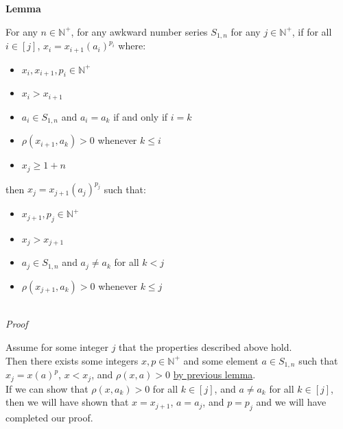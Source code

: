 \documentclass[a4paper,12pt]{article}
\begin{document}
\label{lemma:awkward_expansion}
\hypertarget{lemma:awkward_expansion}{}
\begin{tcolorbox}
\textbf{Lemma}

For any $n \in \mathbb{N}^+$, for any awkward number series $S_{1,n}$ for any $j \in \mathbb{N}^+$, if for all $i \in [j]$, $x_i = x_{i + 1}(a_i)^{p_i}$ where:

\begin{itemize}
\item $x_i, x_{i + 1}, p_i \in \mathbb{N}^+$

\item $x_i > x_{i + 1}$

\item $a_i \in S_{1, n}$ and $a_i = a_k$ if and only if $i = k$

\item $\rho(x_{i + 1}, a_k) > 0$ whenever $k \leq i$

\item $x_j \geq 1 + n$
\end{itemize}

then $x_j = x_{j + 1}(a_j)^{p_j}$ such that:

\begin{itemize}
\item $x_{j + 1}, p_j \in \mathbb{N}^+$

\item $x_j > x_{j + 1}$

\item $a_j \in S_{1, n}$ and $a_j \neq a_k$ for all $k < j$

\item $\rho(x_{j + 1}, a_k) > 0$ whenever $k \leq j$
\end{itemize}

\end{tcolorbox}

\noindent\\
\textit{Proof}

\noindent Assume for some integer $j$ that the properties described above hold.\\

\noindent Then there exists some integers $x, p \in \mathbb{N}^+$ and some element $a \in S_{1, n}$ such that $x_j = x(a)^p$, $x < x_j$, and $\rho(x, a) > 0$ \hyperlink{lemma:non_common_factorization}{by previous lemma}.\\

\noindent If we can show that $\rho(x, a_k) > 0$ for all $k \in [j]$, and $a \neq a_k$ for all $k \in [j]$, then we will have shown that $x = x_{j + 1}$, $a = a_j$, and $p = p_j$ and we will have completed our proof.\\
\end{document}
